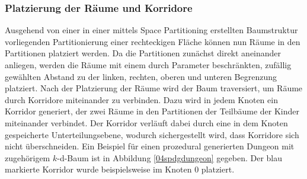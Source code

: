 \subsubsection*{Platzierung der Räume und Korridore}
Ausgehend von einer in einer mittels Space Partitioning erstellten Baumstruktur vorliegenden Partitionierung einer rechteckigen Fläche können nun Räume in den Partitionen platziert werden. Da die Partitionen zunächst direkt aneinander anliegen, werden die Räume mit einem durch Parameter beschränkten, zufällig gewählten Abstand zu der linken, rechten, oberen und unteren Begrenzung platziert. Nach der Platzierung der Räume wird der Baum traversiert, um Räume durch Korridore miteinander zu verbinden. Dazu wird in jedem Knoten ein Korridor generiert, der zwei Räume in den Partitionen der Teilbäume der Kinder miteinander verbindet. Der Korridor verläuft dabei durch eine in dem Knoten gespeicherte Unterteilungsebene, wodurch sichergestellt wird, dass Korridore sich nicht überschneiden. Ein Beispiel für einen prozedural generierten Dungeon mit zugehörigem $k$-d-Baum ist in Abbildung \ref{04spdgdungeon} gegeben. Der blau markierte Korridor wurde beispielsweise im Knoten $0$ platziert.
